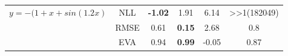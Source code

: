 \begin{table}[H]
\begin{tabular}{|c|c|c|c|c|c|}
		\multirow{3}{*}{$y=-(1+x+sin(1.2x)$}                               & NLL             & \textbf{-1.02}                                                      & 1.91                                                                  & 6.14                & \textgreater{}\textgreater{}1(182049) \\ \cline{2-6} 
		& RMSE            & 0.61                                                                & \textbf{0.15}                                                         & 2.68                & 0.8                                   \\ \cline{2-6} 
		& EVA             & 0.94                                                                & \textbf{0.99}                                                         & -0.05               & 0.87                                  \\ \hline
	\end{tabular}
\end{table}


